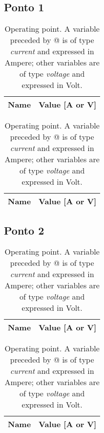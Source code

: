 \subsection{Ponto 1}

\begin{table}[H]
  \centering
  \begin{tabular}{|l|r|}
    \hline    
    {\bf Name} & {\bf Value [A or V]} \\ \hline
    
  \end{tabular}
  \caption{Operating point. A variable preceded by @ is of type {\em current}
    and expressed in Ampere; other variables are of type {\it voltage} and expressed in
    Volt.}
  \label{tab:mat1}
\end{table}


\begin{table}[H]
  \centering
  \begin{tabular}{|l|r|}
    \hline    
    {\bf Name} & {\bf Value [A or V]} \\ \hline
    
  \end{tabular}
  \caption{Operating point. A variable preceded by @ is of type {\em current}
    and expressed in Ampere; other variables are of type {\it voltage} and expressed in
    Volt.}
  \label{tab:mat1a}
\end{table}



\subsection{Ponto 2}

\begin{table}[H]
  \centering
  \begin{tabular}{|l|r|}
    \hline    
    {\bf Name} & {\bf Value [A or V]} \\ \hline
    
  \end{tabular}
  \caption{Operating point. A variable preceded by @ is of type {\em current}
    and expressed in Ampere; other variables are of type {\it voltage} and expressed in
    Volt.}
  \label{tab:mat2}
\end{table}

\begin{table}[H]
  \centering
  \begin{tabular}{|l|r|}
    \hline    
    {\bf Name} & {\bf Value [A or V]} \\ \hline
    
  \end{tabular}
  \caption{Operating point. A variable preceded by @ is of type {\em current}
    and expressed in Ampere; other variables are of type {\it voltage} and expressed in
    Volt.}
  \label{tab:mat2a}
\end{table}

